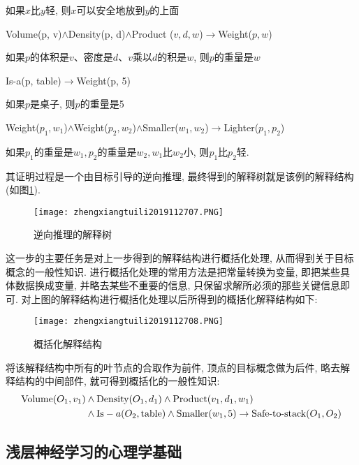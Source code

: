 如果$x$比$y$轻, 则$x$可以安全地放到$y$的上面
\begin{center}
  Volume(p, v)$\wedge$Density(p, d)$\wedge$Product ($v, d, w$)$\rightarrow$Weight($p, w$)
\end{center}

如果$p$的体积是$v$、密度是$d$、$v$乘以$d$的积是$w$, 则$p$的重量是$w$
\begin{center}
  Is-a(p, table)$\rightarrow$Weight(p, 5)
\end{center}

如果$p$是桌子, 则$p$的重量是5
\begin{center}
  Weight($p_1, w_1$)$\wedge$Weight($p_2,w_2$)$\wedge$Smaller($w_1, w_2$)$\rightarrow$Lighter($p_1, p_2$)
\end{center}

如果$p_1$的重量是$w_1, p_2$的重量是$w_2,w_1$比$w_2$小,  则$p_1$比$p_2$轻.

其证明过程是一个由目标引导的逆向推理, 最终得到的解释树就是该例的解释结构(如图\ref{AI32fig2707}).
\begin{figure}[H]
\centering
\texttt{[image: zhengxiangtuili2019112707.PNG]}
\caption{逆向推理的解释树}
\label{AI32fig2707}
\end{figure}

这一步的主要任务是对上一步得到的解释结构进行概括化处理, 从而得到关于目标概念的一般性知识.
     进行概括化处理的常用方法是把常量转换为变量, 即把某些具体数据换成变量, 并略去某些不重要的信息, 只保留求解所必须的那些关键信息即可.
     对上图的解释结构进行概括化处理以后所得到的概括化解释结构如下:
\begin{figure}[H]
\centering
\texttt{[image: zhengxiangtuili2019112708.PNG]}
\caption{概括化解释结构}
\label{AI32fig2708}
\end{figure}
 将该解释结构中所有的叶节点的合取作为前件, 顶点的目标概念做为后件, 略去解释结构的中间部件, 就可得到概括化的一般性知识:
\begin{align}
  \textup{Volume}(O_1,v_1)&\wedge \textup{Density}(O_1,d_1)\wedge \textup{Product}(v_1,d_1,w_1)\notag\\
                          &\wedge \textup{Is}-a(O_2,\textup{table})\wedge\textup{Smaller}(w_1,5)\rightarrow \textup{Safe-to-stack}(O_1,O_2)
\end{align}
\subsection{浅层神经学习的心理学基础}

